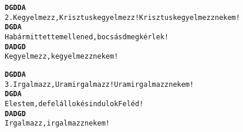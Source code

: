 \begin{minipage}{\textwidth}
\kottastart
{}
\kottaend
\begin{minipage}{\textwidth}
\begin{alltt}
\textbf{    D            G             D      D                    A}
2. Kegyelmezz, Krisztus kegyelmezz! Krisztus kegyelmezz nekem!
\textbf{       D            G         D           A}
   Ha bármit tettem ellened, bocsásd meg kérlek!
\textbf{    D           A            D   G  D}
   Kegyelmezz, kegyelmezz nekem!
\end{alltt}
\vspace{0.0cm}
\versszakspacing
\end{minipage}
\begin{minipage}{\textwidth}
\begin{alltt}
\textbf{   D          G          D    D               A}
3. Irgalmazz, Uram irgalmazz! Uram irgalmazz nekem!
\textbf{   D            G          D          A}
   Elestem, de felállok és indulok Feléd!
\textbf{   D          A            D   G  D}
   Irgalmazz, irgalmazz nekem!
\end{alltt}
\vspace{0.0cm}
\versszakspacing
\end{minipage}
\end{minipage}
~\vspace{1.0cm}
\newline
